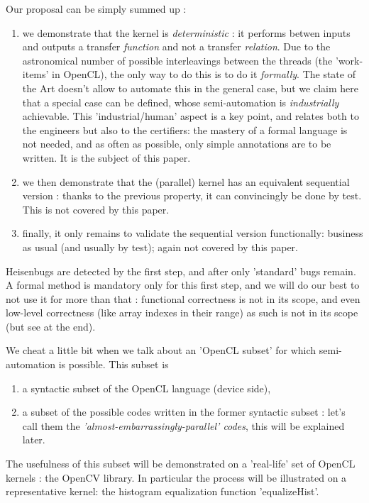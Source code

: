 \documentclass[a4paper,10pt]{article} %
\begin{document}
Our proposal can be simply summed up :
\begin{enumerate}
\item we demonstrate that the kernel is \emph{deterministic} : it performs betwen inputs and outputs a transfer \emph{function} and not a transfer \emph{relation}.
Due to the astronomical number of possible interleavings between the threads (the 'work-items' in OpenCL), the only way to do this is to do it \emph{formally}.
The state of the Art doesn't allow to automate this in the general case, but we claim here that a special case can be defined, whose semi-automation is \emph{industrially} achievable.
This 'industrial/human' aspect is a key point, and relates both to the engineers but also to the certifiers:
the mastery of a formal language is not needed, and as often as possible, only simple annotations are to be written. It is the subject of this paper.
\item we then demonstrate that the (parallel) kernel has an equivalent sequential version : thanks to the previous property, it can convincingly be done by test. This is not covered by this paper.
\item finally, it only remains to validate the sequential version functionally: business as usual (and usually by test); again not covered by this paper.
\end{enumerate}
Heisenbugs are detected by the first step, and after only 'standard' bugs remain.
A formal method is mandatory only for this first step, and we will do our best to not use it for more than that :
functional correctness is not in its scope, and even low-level correctness (like array indexes in their range) as such is not in its scope (but see at the end).

We cheat a little bit when we talk about an  'OpenCL subset' for which semi-automation is possible. This subset is
\begin{enumerate}
\item a syntactic subset of the OpenCL language (device side),
\item a subset of the possible codes written in the former syntactic subset : let's call them the \emph{'almost-embarrassingly-parallel' codes}, this will be explained later.
\end{enumerate}
The usefulness of this subset will be demonstrated on a 'real-life' set of OpenCL kernels : the OpenCV library.
In particular the process will be illustrated on a representative kernel:  the histogram equalization function 'equalizeHist'.
\end{document}

